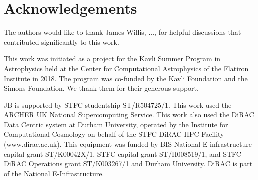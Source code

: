 \section{Acknowledgements}
\label{sec:acknowledgements}

The authors would like to thank James Willis, ..., for helpful discussions
that contributed significantly to this work.

This work was initiated as a project for the Kavli Summer Program in
Astrophysics held at the Center for Computational Astrophysics of the
Flatiron Institute in 2018. The program was co-funded by the Kavli Foundation
and the Simons Foundation. We thank them for their generous support.

JB is supported by STFC studentship ST/R504725/1. This work used the ARCHER
UK National Supercomputing Service. This work also used the DiRAC Data
Centric system at Durham University, operated by the Institute for
Computational Cosmology on behalf of the STFC DiRAC HPC Facility
(www.dirac.ac.uk). This equipment was funded by BIS National E-infrastructure
capital grant ST/K00042X/1, STFC capital grant ST/H008519/1, and STFC DiRAC
Operations grant ST/K003267/1 and Durham University. DiRAC is part of the
National E-Infrastructure.